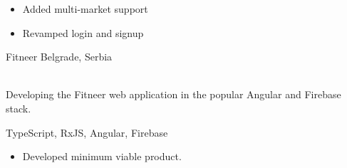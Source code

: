 \documentclass[]{cv-style}          %
\begin{document}
\begin{entrylist}
{    \subtitle{Detailed achievements:}
    \begin{itemize}
      \item Added multi-market support
      \item Revamped login and signup
    \end{itemize}}
  \entry
  {}
  {Fitneer}
  {Belgrade, Serbia}
  {\\
    Developing the Fitneer web application in the popular Angular and Firebase stack.\\
    \subtitle{Tech stack:} TypeScript, RxJS, Angular, Firebase\\
    \subtitle{Detailed achievements:}
    \begin{itemize}
      \item Developed minimum viable product.
    \end{itemize}}

\end{entrylist}





\end{document}
